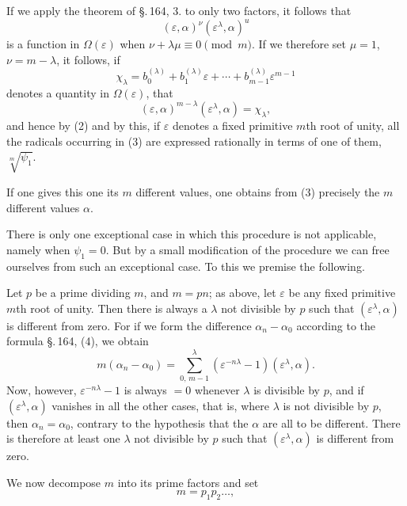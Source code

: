 
If we apply the theorem of \S.\,164, 3. to only two factors, it follows that
\[
(\varepsilon,\alpha)^{\nu}(\varepsilon^{\lambda},\alpha)^{u}
\]
is a function in $\Omega(\varepsilon)$ when $\nu + \lambda\mu \equiv 0 \pmod{m}$. If we therefore set $\mu = 1$, $\nu = m - \lambda$, it follows, if
\[
\chi_\lambda = b_0^{(\lambda)} + b_1^{(\lambda)}\varepsilon + \cdots + b_{m-1}^{(\lambda)}\varepsilon^{m-1}
\]
denotes a quantity in $\Omega(\varepsilon)$, that
\[
(\varepsilon,\alpha)^{m-\lambda}(\varepsilon^{\lambda},\alpha) = \chi_\lambda,
\]
and hence by (2)
and by this, if $\varepsilon$ denotes a fixed primitive $m$th root of unity, all the radicals occurring in (3) are expressed rationally in terms of one of them, $\sqrt[m]{\psi_1}$.

If one gives this one its $m$ different values, one obtains from (3) precisely the $m$ different values $\alpha$.

There is only one exceptional case in which this procedure is not applicable, namely when $\psi_1 = 0$. But by a small modification of the procedure we can free ourselves from such an exceptional case. To this we premise the following.

Let $p$ be a prime dividing $m$, and $m = pn$; as above, let $\varepsilon$ be any fixed primitive $m$th root of unity. Then there is always a $\lambda$ not divisible by $p$ such that $(\varepsilon^{\lambda},\alpha)$ is different from zero. For if we form the difference $\alpha_n - \alpha_0$ according to the formula \S.\,164, (4), we obtain
\[
m(\alpha_n - \alpha_0) = \sum_{0,\,m-1}^{\lambda}(\varepsilon^{-n\lambda} - 1)(\varepsilon^{\lambda},\alpha).
\]
Now, however, $\varepsilon^{-n\lambda} - 1$ is always $= 0$ whenever $\lambda$ is divisible by $p$, and if $(\varepsilon^{\lambda},\alpha)$ vanishes in all the other cases, that is, where $\lambda$ is not divisible by $p$, then $\alpha_n = \alpha_0$, contrary to the hypothesis that the $\alpha$ are all to be different. There is therefore at least one $\lambda$ not divisible by $p$ such that $(\varepsilon^{\lambda},\alpha)$ is different from zero.

We now decompose $m$ into its prime factors and set
\[
m = p_1 p_2 \dots,
\]
